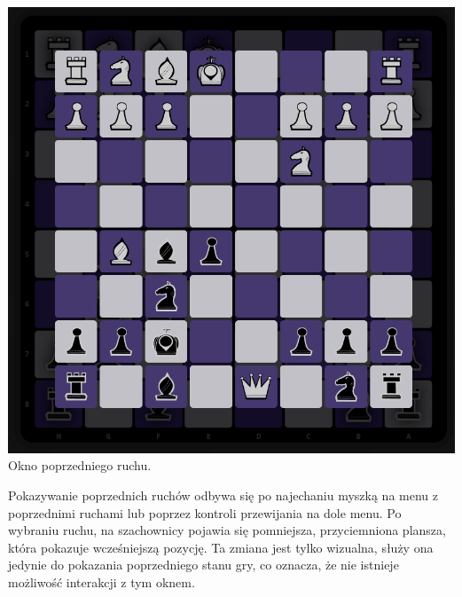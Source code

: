 \documentclass[12pt,a4paper]{article}
\begin{document}
\begin{minipage}[t]{0.35\textwidth} 
    \vspace{0pt} 
    \centering 
    \includegraphics[width=\linewidth]{images/ins_min_prev.png} 
    Okno poprzedniego ruchu.
\end{minipage} 
\hfill 
\begin{minipage}[t]{0.55\textwidth} 
    \vspace{0pt}
    \justifying 
    \noindent 
    Pokazywanie poprzednich ruchów odbywa się po najechaniu myszką na menu z poprzednimi ruchami lub poprzez kontroli przewijania na dole menu. Po wybraniu ruchu, na szachownicy pojawia się pomniejsza, przyciemniona plansza, która pokazuje wcześniejszą pozycję. Ta zmiana jest tylko wizualna, służy ona jedynie do pokazania poprzedniego stanu gry, co oznacza, że nie istnieje możliwość interakcji z tym oknem.
\end{minipage}

\vspace{1cm}
\end{document}
